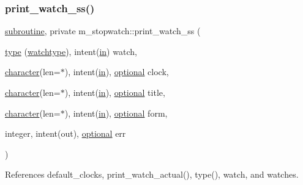\subsubsection{\texorpdfstring{print\+\_\+watch\+\_\+ss()}{print\_watch\_ss()}}
{\footnotesize\ttfamily \hyperlink{M__stopwatch_83_8txt_acfbcff50169d691ff02d4a123ed70482}{subroutine}, private m\+\_\+stopwatch\+::print\+\_\+watch\+\_\+ss (\begin{DoxyParamCaption}\item[{\hyperlink{stop__watch_83_8txt_a70f0ead91c32e25323c03265aa302c1c}{type} (\hyperlink{structm__stopwatch_1_1watchtype}{watchtype}), intent(\hyperlink{M__journal_83_8txt_afce72651d1eed785a2132bee863b2f38}{in})}]{watch,  }\item[{\hyperlink{option__stopwatch_83_8txt_abd4b21fbbd175834027b5224bfe97e66}{character}(len=$\ast$), intent(\hyperlink{M__journal_83_8txt_afce72651d1eed785a2132bee863b2f38}{in}), \hyperlink{option__stopwatch_83_8txt_aa4ece75e7acf58a4843f70fe18c3ade5}{optional}}]{clock,  }\item[{\hyperlink{option__stopwatch_83_8txt_abd4b21fbbd175834027b5224bfe97e66}{character}(len=$\ast$), intent(\hyperlink{M__journal_83_8txt_afce72651d1eed785a2132bee863b2f38}{in}), \hyperlink{option__stopwatch_83_8txt_aa4ece75e7acf58a4843f70fe18c3ade5}{optional}}]{title,  }\item[{\hyperlink{option__stopwatch_83_8txt_abd4b21fbbd175834027b5224bfe97e66}{character}(len=$\ast$), intent(\hyperlink{M__journal_83_8txt_afce72651d1eed785a2132bee863b2f38}{in}), \hyperlink{option__stopwatch_83_8txt_aa4ece75e7acf58a4843f70fe18c3ade5}{optional}}]{form,  }\item[{integer, intent(out), \hyperlink{option__stopwatch_83_8txt_aa4ece75e7acf58a4843f70fe18c3ade5}{optional}}]{err }\end{DoxyParamCaption})\hspace{0.3cm}{\ttfamily [private]}}



References default\+\_\+clocks, print\+\_\+watch\+\_\+actual(), type(), watch, and watches.

